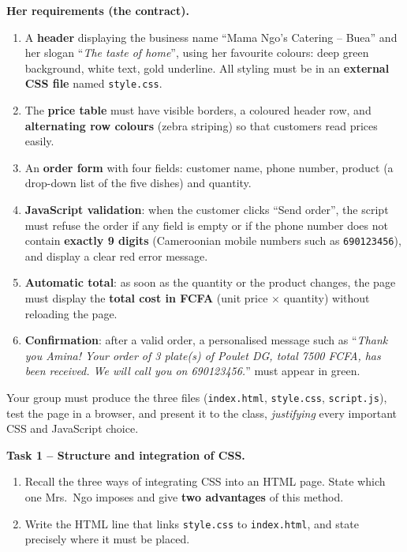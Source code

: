 \documentclass[11pt]{article}
\newcounter{popsec}
\newcounter{popsub}
\newcommand{\courssub}[1]{%
  \stepcounter{popsub}%
  \par\vspace{9pt}\noindent{\popxbold\fontsize{11.5}{13}\selectfont\color{popink}{\color{poporange}\thepopsec.\thepopsub}\hspace{6pt}#1}\par\nopagebreak\vspace{4pt}
}
\begin{document}
\textbf{Her requirements (the contract).}
\begin{enumerate}
\item A \textbf{header} displaying the business name ``Mama Ngo's Catering -- Buea'' and her slogan ``\emph{The taste of home}'', using her favourite colours: deep green background, white text, gold underline. All styling must be in an \textbf{external CSS file} named \texttt{style.css}.
\item The \textbf{price table} must have visible borders, a coloured header row, and \textbf{alternating row colours} (zebra striping) so that customers read prices easily.
\item An \textbf{order form} with four fields: customer name, phone number, product (a drop-down list of the five dishes) and quantity.
\item \textbf{JavaScript validation}: when the customer clicks ``Send order'', the script must refuse the order if any field is empty or if the phone number does not contain \textbf{exactly 9 digits} (Cameroonian mobile numbers such as \texttt{690123456}), and display a clear red error message.
\item \textbf{Automatic total}: as soon as the quantity or the product changes, the page must display the \textbf{total cost in FCFA} (unit price $\times$ quantity) without reloading the page.
\item \textbf{Confirmation}: after a valid order, a personalised message such as ``\emph{Thank you Amina! Your order of 3 plate(s) of Poulet DG, total 7500 FCFA, has been received. We will call you on 690123456.}'' must appear in green.
\end{enumerate}

Your group must produce the three files (\texttt{index.html}, \texttt{style.css}, \texttt{script.js}), test the page in a browser, and present it to the class, \emph{justifying} every important CSS and JavaScript choice.

\courssub{Tasks}

\textbf{Task 1 -- Structure and integration of CSS.}
\begin{enumerate}
\item Recall the three ways of integrating CSS into an HTML page. State which one Mrs.\ Ngo imposes and give \textbf{two advantages} of this method.
\item Write the HTML line that links \texttt{style.css} to \texttt{index.html}, and state precisely where it must be placed.
\end{enumerate}
\end{document}
